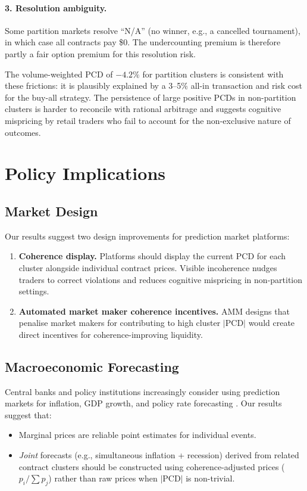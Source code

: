 \documentclass[12pt,a4paper]{article}
\theoremstyle{definition}
\theoremstyle{remark}
\newcommand{\PCD}{\mathrm{PCD}}
\begin{document}
\paragraph{3. Resolution ambiguity.}
Some partition markets resolve ``N/A'' (no winner, e.g., a cancelled
tournament), in which case all contracts pay \$0.
The undercounting premium is therefore partly a fair option premium for
this resolution risk.

The volume-weighted PCD of $-4.2\%$ for partition clusters is
consistent with these frictions: it is plausibly explained by a 3--5\%
all-in transaction and risk cost for the buy-all strategy.
The persistence of large positive PCDs in non-partition clusters is
harder to reconcile with rational arbitrage and suggests cognitive
mispricing by retail traders who fail to account for the non-exclusive
nature of outcomes.

\section{Policy Implications}
\label{sec:policy}

\subsection{Market Design}

Our results suggest two design improvements for prediction market platforms:
\begin{enumerate}
  \item \textbf{Coherence display.}
    Platforms should display the current $\PCD$ for each cluster alongside
    individual contract prices.
    Visible incoherence nudges traders to correct violations and reduces
    cognitive mispricing in non-partition settings.
  \item \textbf{Automated market maker coherence incentives.}
    AMM designs that penalise market makers for contributing to high cluster
    $|\PCD|$ would create direct incentives for coherence-improving liquidity.
\end{enumerate}

\subsection{Macroeconomic Forecasting}

Central banks and policy institutions increasingly consider using prediction
markets for inflation, GDP growth, and policy rate forecasting
\citep{wolfers2004}.
Our results suggest that:
\begin{itemize}
  \item Marginal prices are reliable point estimates for individual events.
  \item \emph{Joint} forecasts (e.g., simultaneous inflation + recession)
    derived from related contract clusters should be constructed using
    coherence-adjusted prices ($p_i / \sum p_j$) rather than raw prices
    when $|\PCD|$ is non-trivial.
\end{itemize}
\end{document}

